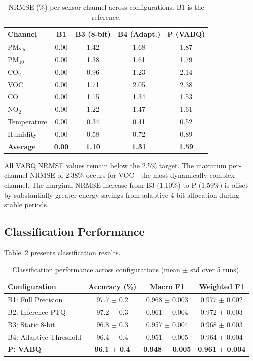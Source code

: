 \begin{table}[H]
\centering
\caption{NRMSE (\%) per sensor channel across configurations. B1 is the reference.}
\label{tab:nrmse}
\begin{tabular}{@{}lcccc@{}}
\toprule
\textbf{Channel} & \textbf{B1} & \textbf{B3 (8-bit)} & \textbf{B4 (Adapt.)} & \textbf{P (VABQ)} \\
\midrule
PM$_{2.5}$  & 0.00 & 1.42 & 1.68 & 1.87 \\
PM$_{10}$   & 0.00 & 1.38 & 1.61 & 1.79 \\
CO$_2$      & 0.00 & 0.96 & 1.23 & 2.14 \\
VOC         & 0.00 & 1.71 & 2.05 & 2.38 \\
CO          & 0.00 & 1.15 & 1.34 & 1.53 \\
NO$_2$      & 0.00 & 1.22 & 1.47 & 1.61 \\
Temperature & 0.00 & 0.34 & 0.41 & 0.52 \\
Humidity    & 0.00 & 0.58 & 0.72 & 0.89 \\
\midrule
\textbf{Average} & \textbf{0.00} & \textbf{1.10} & \textbf{1.31} & \textbf{1.59} \\
\bottomrule
\end{tabular}
\end{table}

All VABQ NRMSE values remain below the 2.5\% target. The maximum per-channel NRMSE of 2.38\% occurs for VOC---the most dynamically complex channel. The marginal NRMSE increase from B3 (1.10\%) to P (1.59\%) is offset by substantially greater energy savings from adaptive 4-bit allocation during stable periods.

\subsection{Classification Performance}
\label{sec:res_classification}

Table~\ref{tab:classification} presents classification results.

\begin{table}[H]
\centering
\caption{Classification performance across configurations (mean $\pm$ std over 5 runs).}
\label{tab:classification}
\begin{tabular}{@{}lccc@{}}
\toprule
\textbf{Configuration} & \textbf{Accuracy (\%)} & \textbf{Macro F1} & \textbf{Weighted F1} \\
\midrule
B1: Full Precision     & 97.7 $\pm$ 0.2 & 0.968 $\pm$ 0.003 & 0.977 $\pm$ 0.002 \\
B2: Inference PTQ      & 97.2 $\pm$ 0.3 & 0.961 $\pm$ 0.004 & 0.972 $\pm$ 0.003 \\
B3: Static 8-bit       & 96.8 $\pm$ 0.3 & 0.957 $\pm$ 0.004 & 0.968 $\pm$ 0.003 \\
B4: Adaptive Threshold & 96.4 $\pm$ 0.4 & 0.951 $\pm$ 0.005 & 0.964 $\pm$ 0.004 \\
\textbf{P: VABQ}       & \textbf{96.1 $\pm$ 0.4} & \textbf{0.948 $\pm$ 0.005} & \textbf{0.961 $\pm$ 0.004} \\
\bottomrule
\end{tabular}
\end{table}


